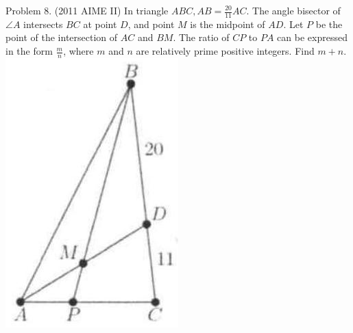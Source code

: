 \documentclass[10pt]{article}
\begin{document}
Problem 8. (2011 AIME II) In triangle \(A B C, A B=\frac{20}{11} A C\). The angle bisector of \(\angle A\) intersects \(B C\) at point \(D\), and point \(M\) is the midpoint of \(A D\). Let \(P\) be the point of the intersection of \(A C\) and \(B M\). The ratio of \(C P\) to \(P A\) can be expressed in the form \(\frac{m}{n}\), where \(m\) and \(n\) are relatively prime positive integers. Find \(m+n\).\\
\includegraphics[max width=\textwidth, center]{2025_04_17_97bc1f7e44d93c271a88g-065(3)}
\end{document}
